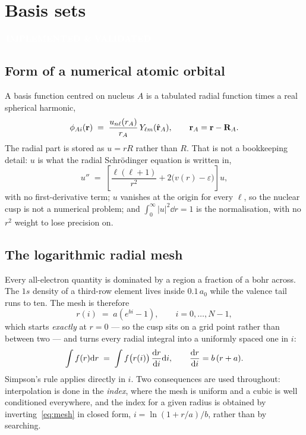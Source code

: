 \documentclass[11pt,a4paper]{article}
\newcommand{\badge}[2]{%
  \par\vspace{2pt}\noindent
  \colorbox{#1}{\textcolor{white}{\small\bfseries\,#2\,}}\par\vspace{4pt}}
\newcommand{\implemented}{\badge{okgreen}{IMPLEMENTED \& VALIDATED}}
\begin{document}
\section{Basis sets}
\label{sec:basis}
\implemented

\subsection{Form of a numerical atomic orbital}

A basis function centred on nucleus $A$ is a tabulated radial function times a
real spherical harmonic,
\begin{equation}
  \phi_{A i}(\vb{r}) \;=\; \frac{u_{n\ell}(r_A)}{r_A}\,
                            Y_{\ell m}(\hat{\vb{r}}_A),
  \qquad \vb{r}_A = \vb{r} - \vb{R}_A .
  \label{eq:nao}
\end{equation}
The radial part is stored as $u = rR$ rather than $R$. That is not a
bookkeeping detail: $u$ is what the radial Schr\"odinger equation is written
in,
\begin{equation}
  u'' \;=\; \left[ \frac{\ell(\ell+1)}{r^2} + 2\bigl(v(r) - \varepsilon\bigr)
            \right] u ,
  \label{eq:radial}
\end{equation}
with no first-derivative term; $u$ vanishes at the origin for every $\ell$, so
the nuclear cusp is not a numerical problem; and $\int_0^\infty |u|^2 \dd r =
1$ is the normalisation, with no $r^2$ weight to lose precision on.

\subsection{The logarithmic radial mesh}

Every all-electron quantity is dominated by a region a fraction of a bohr
across. The $1s$ density of a third-row element lives inside $0.1\,a_0$ while
the valence tail runs to ten. The mesh is therefore
\begin{equation}
  r(i) \;=\; a\left(e^{b i} - 1\right), \qquad i = 0,\dots,N-1 ,
  \label{eq:mesh}
\end{equation}
which starts \emph{exactly} at $r=0$ --- so the cusp sits on a grid point
rather than between two --- and turns every radial integral into a uniformly
spaced one in $i$:
\begin{equation}
  \int f(r)\dd r \;=\; \int f\bigl(r(i)\bigr)\,\dv{r}{i}\dd i ,
  \qquad \dv{r}{i} = b\,(r + a).
\end{equation}
Simpson's rule applies directly in $i$. Two consequences are used
throughout: interpolation is done in the \emph{index}, where the mesh is
uniform and a cubic is well conditioned everywhere, and the index for a given
radius is obtained by inverting~\eqref{eq:mesh} in closed form,
$i = \ln(1 + r/a)/b$, rather than by searching.
\end{document}
